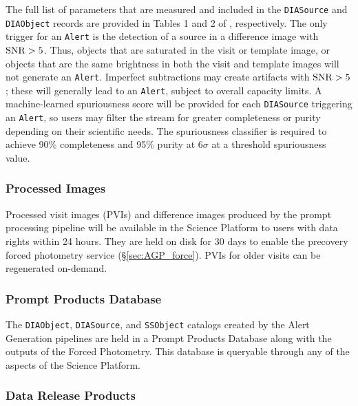 The full list of parameters that are measured and included in the {\tt DIASource} and {\tt DIAObject} records are provided in Tables 1 and 2 of , respectively.
The only trigger for an {\tt Alert} is the detection of a source in a difference image with ${\rm SNR} > 5$.
Thus, objects that are saturated in the visit or template image, or objects that are the same brightness in both the visit and template images will not generate an {\tt Alert}.
Imperfect subtractions may create artifacts with ${\rm SNR} > 5$;
these will generally lead to an \texttt{Alert}, subject to overall capacity limits.
A machine-learned spuriousness score will be provided for each \texttt{DIASource} triggering an \texttt{Alert}, so users may filter the stream for greater completeness or purity depending on their scientific needs.
The spuriousness classifier is required to achieve
90\% completeness and 95\% purity at 6$\sigma$  at a threshold spuriousness value.


\subsubsection{Processed Images} \label{sec:products}

Processed visit images (PVIs) and difference images produced by the prompt processing pipeline will be available in the Science Platform to users with data rights within 24 hours.
They are held on disk for 30 days to enable the precovery forced photometry service (\S \ref{sec:AGP_force}).
PVIs for older visits can be regenerated on-demand.

\subsubsection{Prompt Products Database} \label{sec:ppdb}

The \texttt{DIAObject}, \texttt{DIASource}, and \texttt{SSObject} catalogs created by the Alert Generation pipelines are held in a Prompt Products Database along with the outputs of the Forced Photometry.
This database is queryable through any of the aspects of the Science Platform.


\subsubsection{Data Release Products} \label{sec:drp}


